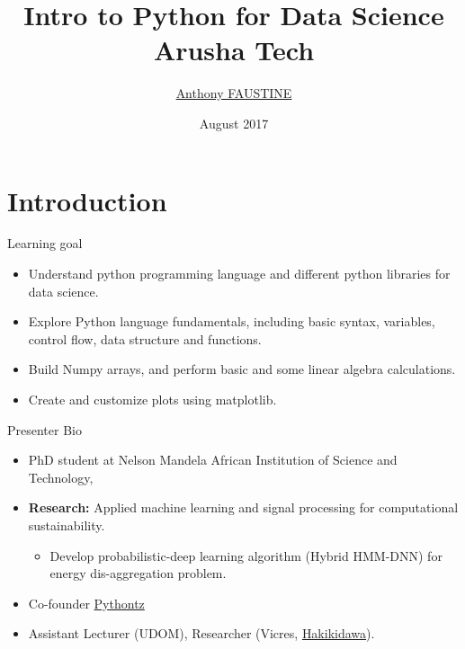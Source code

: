 \documentclass{bredelebeamer}
\title[PhD]{\textbf{Intro to Python for Data Science \\ Arusha Tech}}
\subtitle{\textbf{} }
\author{ \href{https://sambaiga.github.io/ }{\href{https://sambaiga.github.io/}{Anthony FAUSTINE} }}
\date{August 2017}
\begin{document}
\begin{frame}
	\titlepage
\end{frame}








\section{Introduction}

\begin{frame}{Learning goal}
\begin{itemize}
	\item Understand python programming language and different python libraries for data science.
	\item Explore Python language fundamentals, including basic syntax, variables, control flow, data structure and functions.
	\item Build Numpy arrays, and perform basic and some linear algebra calculations.
	\item Create and customize plots  using matplotlib.
\end{itemize}
\end{frame}
\begin{frame}{Presenter Bio}
\begin{itemize}
\item PhD student at Nelson Mandela African Institution of Science and Technology, 
\item \textbf{Research:}  Applied machine learning and signal processing for computational sustainability.
\begin{itemize}
	\item Develop probabilistic-deep learning algorithm (Hybrid HMM-DNN) for energy dis-aggregation problem.
\end{itemize}	
\item Co-founder \href{https://pythontz.github.io/}{Pythontz}
\item Assistant Lecturer (UDOM), Researcher (Vicres, \href{https://hakikidawa.github.io/}{Hakikidawa}).
\end{itemize}
\end{frame}
\end{document}
